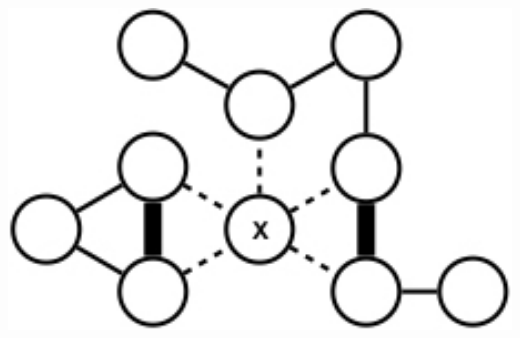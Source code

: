 \documentclass{beamer}
\begin{document}
\begin{frame}
\begin{columns}
\begin{column}{0.35\textwidth}
\begin{center}
	\end{center}
	\begin{center}
		\includegraphics[width=1.0\textwidth]{vertex_local}
	\end{center}
\end{column}

\end{columns}


\end{frame}


\end{document}
